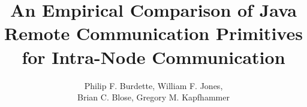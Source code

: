\documentclass{sig-alternate}
\begin{document}



\title{An Empirical Comparison of Java Remote Communication Primitives
  for Intra-Node Communication}


\author{
\alignauthor Philip F. Burdette, William F. Jones, \\
 Brian C. Blose, Gregory M. Kapfhammer \\
       \\
        \\ 
}
\maketitle
\end{document}
